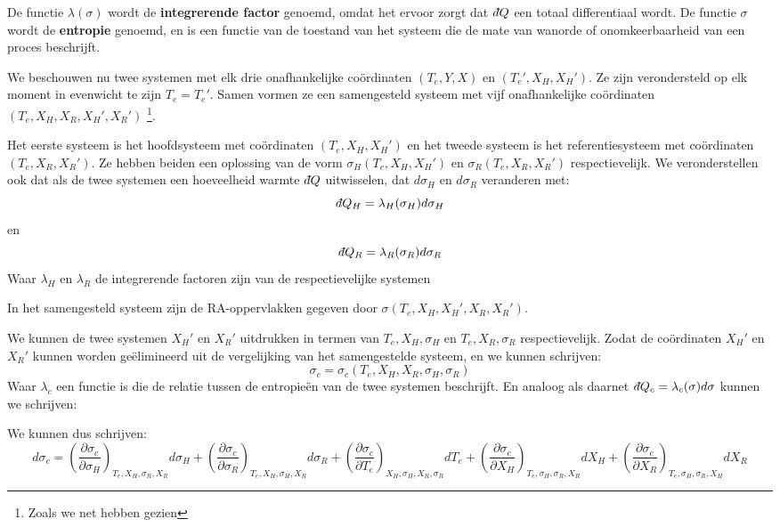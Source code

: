 \begin{definition}
    De functie \(\lambda(\sigma)\) wordt de \textbf{integrerende factor} genoemd, omdat het ervoor zorgt dat \(\dbar Q\) een totaal differentiaal wordt.
    De functie \(\sigma\) wordt de \textbf{entropie} genoemd, en is een functie van de toestand van het systeem die de mate van wanorde of onomkeerbaarheid van een proces beschrijft.
\end{definition}


\begin{derivation}
We beschouwen nu twee systemen met elk drie onafhankelijke coördinaten \((T_e, Y, X)\) en \((T_e', X_H, X_H')\). Ze zijn verondersteld op elk moment in evenwicht te zijn \(T_e = T_e'\).
Samen vormen ze een samengesteld systeem met vijf onafhankelijke coördinaten \((T_e, X_H, X_R, X_H', X_R')\) \footnote{Zoals we net hebben gezien}.

Het eerste systeem is het hoofdsysteem met coördinaten \((T_e, X_H, X_H')\) en het tweede systeem is het referentiesysteem met coördinaten \((T_e, X_R, X_R')\).
Ze hebben beiden een oplossing van de vorm \(\sigma_H (T_e, X_H, X_H')\) en \(\sigma_R (T_e, X_R, X_R')\) respectievelijk.
We veronderstellen ook dat als de twee systemen een hoeveelheid warmte \(\dbar Q\) uitwisselen, dat \(d\sigma_H\) en \(d\sigma_R\) veranderen met:
\[\dbar Q_H = \lambda_H(\sigma_H) d\sigma_H\] en \[\dbar Q_R = \lambda_R(\sigma_R) d\sigma_R\]
Waar \(\lambda_H\) en \(\lambda_R\) de integrerende factoren zijn van de respectievelijke systemen

In het samengesteld systeem zijn de RA-oppervlakken gegeven door \(\sigma (T_e, X_H, X_H', X_R, X_R') \).

We kunnen de twee systemen  \(X_H'\) en \(X_R'\) uitdrukken in termen van \(T_e,X_H, \sigma_H\) en \(T_e, X_R, \sigma_R\) respectievelijk.
Zodat de coördinaten \(X_H'\) en \(X_R'\) kunnen worden geëlimineerd uit de vergelijking van het samengestelde systeem, en we kunnen schrijven:
\[\sigma_c = \sigma_c (T_e, X_H, X_R, \sigma_H, \sigma_R) \]
Waar \(\lambda_c\) een functie is die de relatie tussen de entropieën van de twee systemen beschrijft.
En analoog als daarnet \( \dbar Q_c = \lambda_c(\sigma) d\sigma\) kunnen we schrijven:

We kunnen dus schrijven:
\tiny
\[d\sigma_c = \left(\frac{\partial \sigma_c}{\partial \sigma_H}\right)_{T_e, X_H, \sigma_R , X_R} d\sigma_H
 + \left(\frac{\partial \sigma_c}{\partial \sigma_R}\right)_{ T_e, X_H, \sigma_H, X_R} d\sigma_R
+ \left(\frac{\partial \sigma_c}{\partial T_e}\right)_{X_H, \sigma_H, X_R, \sigma_R} dT_e
+ \left( \frac{\partial \sigma_c}{\partial X_H} \right)_{T_e, \sigma_H, \sigma_R, X_R} dX_H
+ \left(\frac{\partial \sigma_c}{\partial X_R} \right)_{T_e, \sigma_H, \sigma_R, X_H} dX_R\]
\normalsize


\end{derivation}
